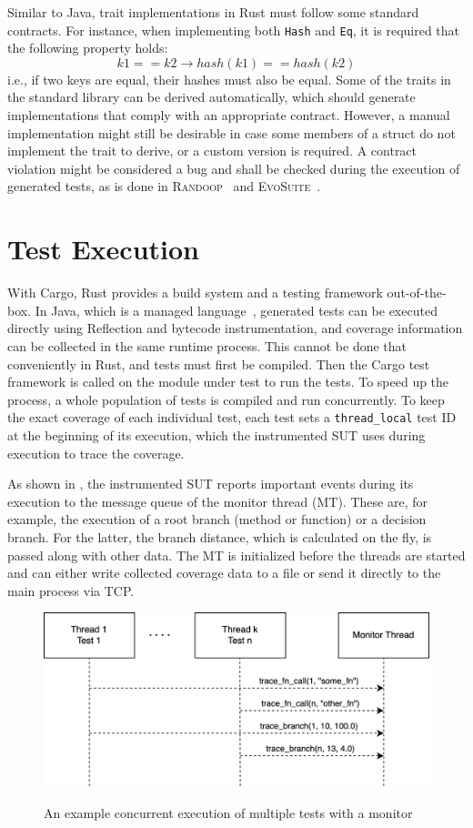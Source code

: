 \documentclass[paper=a4,%
  twoside,%
  BCOR4mm,%
  abstract=true,%
  toc=bibliography,%
  chapterprefix=true,%
  toc=bibliographynumbered,%
  open=right,%
  english,%
  pagesize=pdftex]{scrreprt}
\begin{document}
Similar to Java, trait implementations in Rust must follow some standard contracts. For instance, when implementing both \lstinline{Hash} and \lstinline{Eq}, it is required that the following property holds:
\[
k1 == k2 \longrightarrow hash(k1) == hash(k2)
\]
i.e., if two keys are equal, their hashes must also be equal. Some of the traits in the standard library can be derived automatically, which should generate implementations that comply with an appropriate contract. However, a manual implementation might still be desirable in case some members of a struct do not implement the trait to derive, or a custom version is required. A contract violation might be considered a bug and shall be checked during the execution of generated tests, as is done in \textsc{Randoop}~\cite{Pacheco_2007} and \textsc{EvoSuite}~\cite{Fraser2013}.

\section{Test Execution}
With Cargo, Rust provides a build system and a testing framework out-of-the-box. In Java, which is a managed language~\cite{Gough2005}, generated tests can be executed directly using Reflection and bytecode instrumentation, and coverage information can be collected in the same runtime process. This cannot be done that conveniently in Rust, and tests must first be compiled. Then the Cargo test framework is called on the module under test to run the tests. To speed up the process, a whole population of tests is compiled and run concurrently. To keep the exact coverage of each individual test, each test sets a \lstinline{thread_local} test ID at the beginning of its execution, which the instrumented \ac{SUT} uses during execution to trace the coverage.

As shown in , the instrumented \ac{SUT} reports important events during its execution to the message queue of the monitor thread (MT). These are, for example, the execution of a root branch (method or function) or a decision branch. For the latter, the branch distance, which is calculated on the fly, is passed along with other data. The MT is initialized before the threads are started and can either write collected coverage data to a file or send it directly to the main process via TCP.

\begin{figure}[h]
\caption{An example concurrent execution of multiple tests with a monitor}
\centering
\includegraphics[width=\textwidth]{test-execution}
\label{fig:test-execution}
\end{figure}
\end{document}
